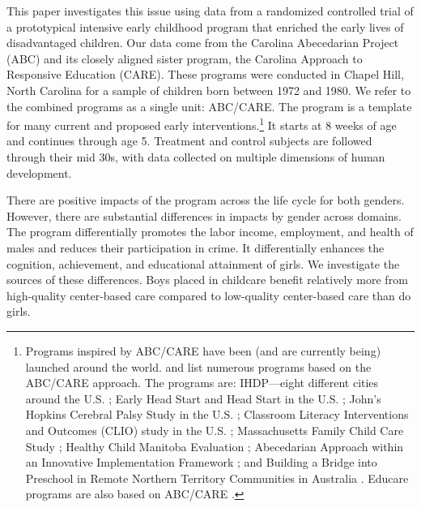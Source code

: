 This paper investigates this issue using data from a randomized controlled trial of a prototypical intensive early childhood program that enriched the early lives of disadvantaged children. Our data come from the Carolina Abecedarian Project (ABC) and its closely aligned sister program, the Carolina Approach to Responsive Education (CARE). These programs were conducted in Chapel Hill, North Carolina for a sample of children born between 1972 and 1980. We refer to the combined programs as a single unit: ABC/CARE. The program is a template for many current and proposed early interventions.\footnote{Programs inspired by ABC/CARE have been (and are currently being) launched around the world. \citet{Sparling_2010_Highlights} and \citet{Ramey_Ramey_Lanzi_2014_Interventions} list numerous programs based on the ABC/CARE approach. The programs are: IHDP---eight different cities around the U.S. \citep{Spiker-etal_1997_Helping}; Early Head Start and Head Start in the U.S. \citep{Schneider_McDonald-eds_2007_Scale-Up_Vol-1}; John's Hopkins Cerebral Palsy Study in the U.S. \citep{Sparling_2010_Highlights}; Classroom Literacy Interventions and Outcomes (CLIO) study in the U.S. \citep{Sparling_2010_Highlights}; Massachusetts Family Child Care Study \citep{Collins_etal_2010_Massachusetts-Study}; Healthy Child Manitoba Evaluation \citep{Healthy_Child_Manitoba_2015_Starting-Early}; Abecedarian Approach within an Innovative Implementation Framework \citep{Jensen_Nielsen_2016_ABC-Programme-Pilot}; and Building a Bridge into Preschool in Remote Northern Territory Communities in Australia \citep{UMonash_Dataset_2015_URL}. Educare programs are also based on ABC/CARE \citep{Educare_2014_Research_Agenda,Yazejian_Bryant_2012_Educare}.} It starts at 8 weeks of age and continues through age 5. Treatment and control subjects are followed through their mid 30s, with data collected on multiple dimensions of human development.

There are positive impacts of the program across the life cycle for both genders. However, there are substantial differences in impacts by gender across domains. The program differentially promotes the labor income, employment, and health of males and reduces their participation in crime. It differentially enhances the cognition, achievement, and educational attainment of girls. We investigate the sources of these differences. Boys placed in childcare benefit relatively more from high-quality center-based care compared to low-quality center-based care than do girls.

